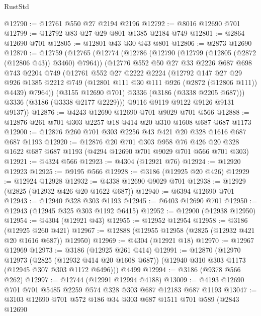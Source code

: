 \begin{lexlean}{RustStd}
\begin{coremodule}
@12790 := @12761 @550 @27 @2194 @2196
@12792 := @8016 @12690 @701
@12799 := @12792 @83 @27 @29 @801 @1385 @2184 @749
@12801 := @2864 @12690 @701
@12805 := @12801 @43 @30 @43 @801
@12806 := @2873 @12690
@12870 := @12759
    (@12765
      (@12774
        (@12786
          (@12790 (@12799 (@12805 (@2872 (@12806 @43)) @3460) @7964))
          (@12776
            @552
            @50
            @27
            @33
            @2226
            @687
            @698
            @743
            @2204
            @749
            (@12761
              @552
              @27
              @2222
              @2224
              (@12792
                @147
                @27
                @29
                @926
                @1385
                @2212
                @749
                (@12801 @111 @30 @111 @926 (@2872 (@12806 @111)) @4439)
                @7964))
            (@3155 @12690 @701)
            @3336
            (@3186 (@3338 @2205 @687)))
          @3336
          (@3186 (@3338 @2177 @2229)))
        @9116
        @9119
        @9122
        @9126
        @9131
        @9137))
@12876 := @4243 @12690 @12690 @701 @9029 @701 @566
@12888 := @12876 @261 @701 @303 @2257 @18 @414 @20 @310 @1608 @687 @687 @1173
@12900 := @12876 @260 @701 @303 @2256 @43 @421 @20 @328 @1616 @687 @687 @1193
@12920 := @12876
    @20
    @701
    @303
    @958
    @76
    @426
    @20
    @328
    @1622
    @687
    @687
    @1193
    (@4294 @12690 @701 @9029 @701 @566 @701 @303)
@12921 := @4324 @566
@12923 := @4304 (@12921 @76)
@12924 := @12920 @12923
@12925 := @9195 @566
@12928 := @3186 (@12925 @20 @426)
@12929 := @12924 @12928
@12932 := @4338 @12690 @9029 @701
@12938 := @12929 (@2825 (@12932 @426 @20 @1622 @687))
@12940 := @6394 @12690 @701
@12943 := @12940 @328 @303 @1193
@12945 := @6403 @12690 @701
@12950 := @12943 (@12945 @325 @303 @1192 @6415)
@12952 := @12900 (@12938 @12950)
@12954 := @4304 (@12921 @43)
@12955 := @12952 @12954
@12958 := @3186 (@12925 @260 @421)
@12967 := @12888 (@12955 @12958 (@2825 (@12932 @421 @20 @1616 @687)) @12950)
@12969 := @4304 (@12921 @18)
@12970 := @12967 @12969
@12973 := @3186 (@12925 @261 @414)
@12991 := @12870
    (@12970
      @12973
      (@2825 (@12932 @414 @20 @1608 @687))
      (@12940 @310 @303 @1173 (@12945 @307 @303 @1172 @6496)))
    @4499
@12994 := @3186 (@9378 @566 @262)
@12997 := @12744 (@12991 @12994 @4188)
@13009 := @4193 @12690 @701 @701 @5485 @2259 @574 @328 @303 @687 @12183 @687 @1193
@13047 := @3103
    @12690
    @701
    @572
    @186
    @34
    @303
    @687
    @1511
    @701
    @589
    (@2843
      @12690

\end{coremodule}
\end{lexlean}
